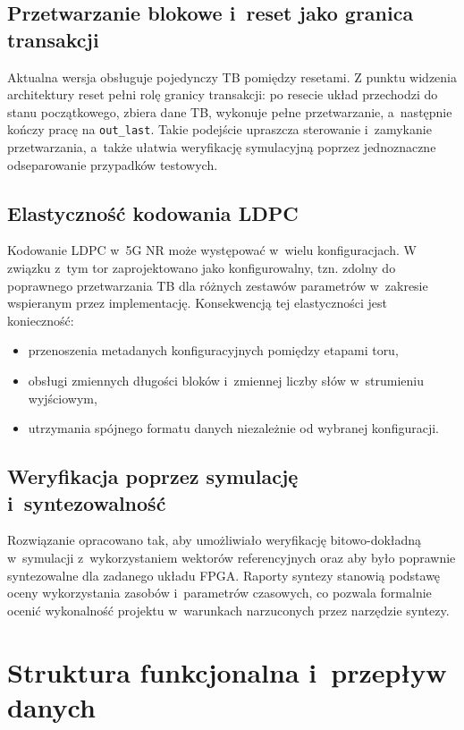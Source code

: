 \subsection{Przetwarzanie blokowe i~reset jako granica transakcji}
Aktualna wersja obsługuje pojedynczy TB pomiędzy resetami. Z punktu widzenia architektury reset pełni rolę granicy transakcji: po resecie układ przechodzi do stanu początkowego, zbiera dane TB, wykonuje pełne przetwarzanie, a~następnie kończy pracę na \texttt{out\_last}. Takie podejście upraszcza sterowanie i~zamykanie przetwarzania, a~także ułatwia weryfikację symulacyjną poprzez jednoznaczne odseparowanie przypadków testowych.

\subsection{Elastyczność kodowania LDPC}
Kodowanie LDPC w~5G NR może występować w~wielu konfiguracjach. W związku z~tym tor zaprojektowano jako konfigurowalny, tzn. zdolny do poprawnego przetwarzania TB dla różnych zestawów parametrów w~zakresie wspieranym przez implementację. Konsekwencją tej elastyczności jest konieczność:
\begin{itemize}
    \item przenoszenia metadanych konfiguracyjnych pomiędzy etapami toru,
    \item obsługi zmiennych długości bloków i~zmiennej liczby słów w~strumieniu wyjściowym,
    \item utrzymania spójnego formatu danych niezależnie od wybranej konfiguracji.
\end{itemize}

\subsection{Weryfikacja poprzez symulację i~syntezowalność}
Rozwiązanie opracowano tak, aby umożliwiało weryfikację bitowo-dokładną w~symulacji z~wykorzystaniem wektorów referencyjnych oraz aby było poprawnie syntezowalne dla zadanego układu FPGA. Raporty syntezy stanowią podstawę oceny wykorzystania zasobów i~parametrów czasowych, co pozwala formalnie ocenić wykonalność projektu w~warunkach narzuconych przez narzędzie syntezy.


\section{Struktura funkcjonalna i~przepływ danych}
\label{sec:struktura_i_przeplyw}

